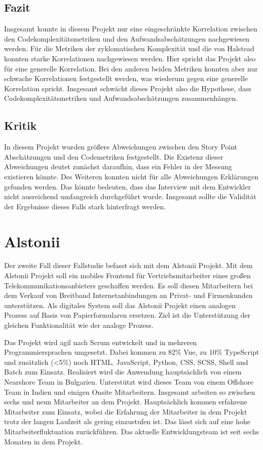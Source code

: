 \subsection{Fazit}\label{ingrid-fazit}

Insgesamt konnte in diesem Projekt nur eine eingeschränkte Korrelation
zwischen den Codekomplexitätsmetriken und den Aufwandsabschätzungen
nachgewiesen werden. Für die Metriken der zyklomatischen Komplexität und
die von Halstead konnten starke Korrelationen nachgewiesen werden. Hier
spricht das Projekt also für eine generelle Korrelation. Bei den anderen
beiden Metriken konnten aber nur schwache Korrelationen festgestellt
werden, was wiederum gegen eine generelle Korrelation spricht. Insgesamt
schwächt dieses Projekt also die Hypothese, dass
Codekomplexitätsmetriken und Aufwandsabschätzungen zusammenhängen.

\subsection{Kritik}\label{ingrid-kritik}

In diesem Projekt wurden grö\ss ere Abweichungen zwischen den Story Point
Abschätzungen und den Codemetriken festgestellt. Die Existenz dieser
Abweichungen deutet zunächst daraufhin, dass ein Fehler in der Messung
existieren könnte. Des Weiteren konnten nicht für alle Abweichungen
Erklärungen gefunden werden. Das könnte bedeuten, dass das Interview mit
dem Entwickler nicht ausreichend umfangreich durchgeführt wurde.
Insgesamt sollte die Validität der Ergebnisse dieses Falls stark
hinterfragt werden.

\section{Alstonii}\label{alstonii}

Der zweite Fall dieser Fallstudie befasst sich mit dem Alstonii
Projekt. Mit dem Alstonii Projekt soll ein mobiles Frontend für
Vertriebsmitarbeiter eines gro\ss en Telekommunikationsanbieters geschaffen
werden. Es soll diesen Mitarbeitern bei dem Verkauf von Breitband
Internetanbindungen an Privat- und Firmenkunden unterstützen. Als
digitales System soll das Alstonii Projekt einen analogen Prozess auf Basis
von Papierformularen ersetzen. Ziel ist die Unterstützung der gleichen
Funktionalität wie der analoge Prozess.

Das Projekt wird agil nach Scrum entwickelt und in mehreren
Programmiersprachen umgesetzt. Dabei kommen zu 82\% Vue, zu 10\%
TypeScript und zusätzlich (\textless5\%) noch \ac{HTML}, JavaScript, Python,
CSS, SCSS, Shell und Batch zum Einsatz. Realisiert
wird die Anwendung hauptsächlich von einem Nearshore Team in Bulgarien.
Unterstützt wird dieses Team von einem Offshore Team in Indien und
einigen Onsite Mitarbeitern. Insgesamt arbeiten so zwischen sechs und
neun Mitarbeiter an dem Projekt. Hauptsächlich kommen erfahrene
Mitarbeiter zum Einsatz, wobei die Erfahrung der Mitarbeiter in dem
Projekt trotz der langen Laufzeit als gering einzustufen ist. Das lässt
sich auf eine hohe Mitarbeiterfluktuation zurückführen. Das aktuelle
Entwicklungsteam ist seit sechs Monaten in dem Projekt.

